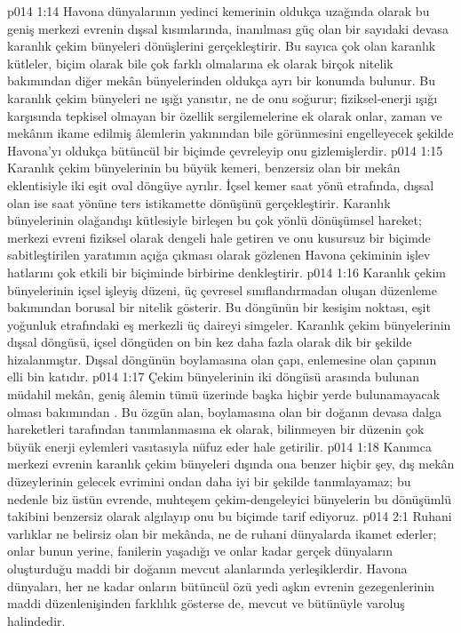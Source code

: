 \vs p014 1:14 Havona dünyalarının yedinci kemerinin oldukça uzağında olarak bu geniş merkezi evrenin dışsal kısımlarında, inanılması güç olan bir sayıdaki devasa karanlık çekim bünyeleri dönüşlerini gerçekleştirir. Bu sayıca çok olan karanlık kütleler, biçim olarak bile çok farklı olmalarına ek olarak birçok nitelik bakımından diğer mekân bünyelerinden oldukça ayrı bir konumda bulunur. Bu karanlık çekim bünyeleri ne ışığı yansıtır, ne de onu soğurur; fiziksel\hyp{}enerji ışığı karşısında tepkisel olmayan bir özellik sergilemelerine ek olarak onlar, zaman ve mekânın ikame edilmiş âlemlerin yakınından bile görünmesini engelleyecek şekilde Havona’yı oldukça bütüncül bir biçimde çevreleyip onu gizlemişlerdir.
\vs p014 1:15 Karanlık çekim bünyelerinin bu büyük kemeri, benzersiz olan bir mekân eklentisiyle iki eşit oval döngüye ayrılır. İçsel kemer saat yönü etrafında, dışsal olan ise saat yönüne ters istikamette dönüşünü gerçekleştirir. Karanlık bünyelerinin olağandışı kütlesiyle birleşen bu çok yönlü dönüşümsel hareket; merkezi evreni fiziksel olarak dengeli hale getiren ve onu kusursuz bir biçimde sabitleştirilen yaratımın açığa çıkması olarak gözlenen Havona çekiminin işlev hatlarını çok etkili bir biçiminde birbirine denkleştirir.
\vs p014 1:16 Karanlık çekim bünyelerinin içsel işleyiş düzeni, üç çevresel sınıflandırmadan oluşan düzenleme bakımından borusal bir nitelik gösterir. Bu döngünün bir kesişim noktası, eşit yoğunluk etrafındaki eş merkezli üç daireyi simgeler. Karanlık çekim bünyelerinin dışsal döngüsü, içsel döngüden on bin kez daha fazla olarak dik bir şekilde hizalanmıştır. Dışsal döngünün boylamasına olan çapı, enlemesine olan çapının elli bin katıdır.
\vs p014 1:17 Çekim bünyelerinin iki döngüsü arasında bulunan müdahil mekân, geniş âlemin tümü üzerinde başka hiçbir yerde bulunamayacak olması bakımından . Bu özgün alan, boylamasına olan bir doğanın devasa dalga hareketleri tarafından tanımlanmasına ek olarak, bilinmeyen bir düzenin çok büyük enerji eylemleri vasıtasıyla nüfuz eder hale getirilir.
\vs p014 1:18 Kanımca merkezi evrenin karanlık çekim bünyeleri dışında ona benzer hiçbir şey, dış mekân düzeylerinin gelecek evrimini ondan daha iyi bir şekilde tanımlayamaz; bu nedenle biz üstün evrende, muhteşem çekim\hyp{}dengeleyici bünyelerin bu dönüşümlü takibini benzersiz olarak algılayıp onu bu biçimde tarif ediyoruz.
\vs p014 2:1 Ruhani varlıklar ne belirsiz olan bir mekânda, ne de ruhani dünyalarda ikamet ederler; onlar bunun yerine, fanilerin yaşadığı ve onlar kadar gerçek dünyaların oluşturduğu maddi bir doğanın mevcut alanlarında yerleşiklerdir. Havona dünyaları, her ne kadar onların bütüncül özü yedi aşkın evrenin gezegenlerinin maddi düzenlenişinden farklılık gösterse de, mevcut ve bütünüyle varoluş halindedir.
